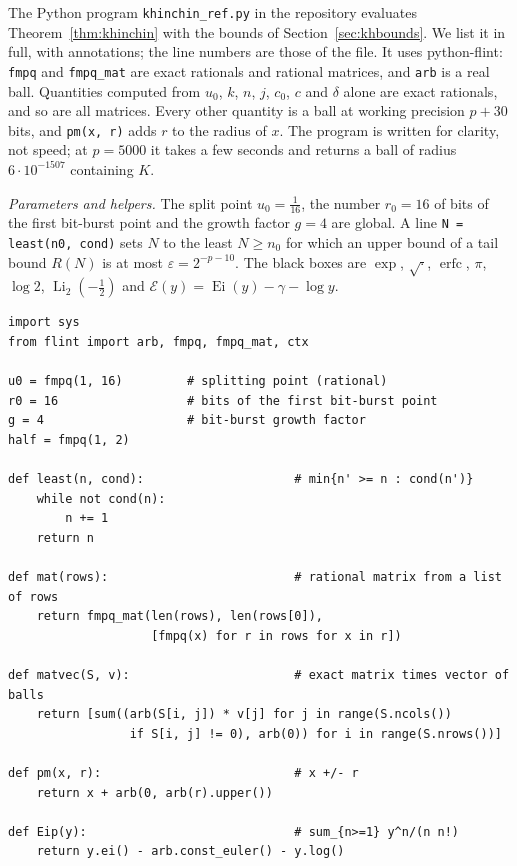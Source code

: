 \documentclass[11pt,reqno]{amsart}
\theoremstyle{definition}
\theoremstyle{remark}
\newcommand{\erfc}{\operatorname{erfc}}
\newcommand{\Eip}{\mathcal{E}}
\newcommand{\Li}{\operatorname{Li}}
\begin{document}

The Python program \texttt{khinchin\_ref.py} in the repository evaluates Theorem~\ref{thm:khinchin} with the
bounds of Section~\ref{sec:khbounds}. We list it in full, with annotations; the line numbers are those of the
file. It uses python-flint: \texttt{fmpq} and \texttt{fmpq\_mat} are exact rationals and rational matrices, and
\texttt{arb} is a real ball. Quantities computed from $u_0$, $k$, $n$, $j$, $c_0$, $c$ and $\delta$ alone are exact
rationals, and so are all matrices. Every other quantity is a ball at working precision $p + 30$ bits, and
\texttt{pm(x, r)} adds $r$ to the radius of $x$. The program is written for clarity, not speed; at $p = 5000$ it
takes a few seconds and returns a ball of radius $6\cdot10^{-1507}$ containing $K$.

\emph{Parameters and helpers.} The split point $u_0 = \frac1{16}$, the number $r_0 = 16$ of bits of the first
bit-burst point and the growth factor $g = 4$ are global. A line \texttt{N = least(n0, cond)} sets $N$ to the least
$N \ge n_0$ for which an upper bound of a tail bound $R(N)$ is at most $\varepsilon = 2^{-p-10}$. The black boxes are
$\exp$, $\sqrt{\cdot}$, $\erfc$, $\pi$, $\log 2$, $\Li_2(-\frac12)$ and $\Eip(y) = \operatorname{Ei}(y) - \gamma - \log y$.
\begin{lstlisting}[style=ref, firstnumber=12]
import sys
from flint import arb, fmpq, fmpq_mat, ctx

u0 = fmpq(1, 16)         # splitting point (rational)
r0 = 16                  # bits of the first bit-burst point
g = 4                    # bit-burst growth factor
half = fmpq(1, 2)

def least(n, cond):                     # min{n' >= n : cond(n')}
    while not cond(n):
        n += 1
    return n

def mat(rows):                          # rational matrix from a list of rows
    return fmpq_mat(len(rows), len(rows[0]),
                    [fmpq(x) for r in rows for x in r])

def matvec(S, v):                       # exact matrix times vector of balls
    return [sum((arb(S[i, j]) * v[j] for j in range(S.ncols())
                 if S[i, j] != 0), arb(0)) for i in range(S.nrows())]

def pm(x, r):                           # x +/- r
    return x + arb(0, arb(r).upper())

def Eip(y):                             # sum_{n>=1} y^n/(n n!)
    return y.ei() - arb.const_euler() - y.log()
\end{lstlisting}
\end{document}
